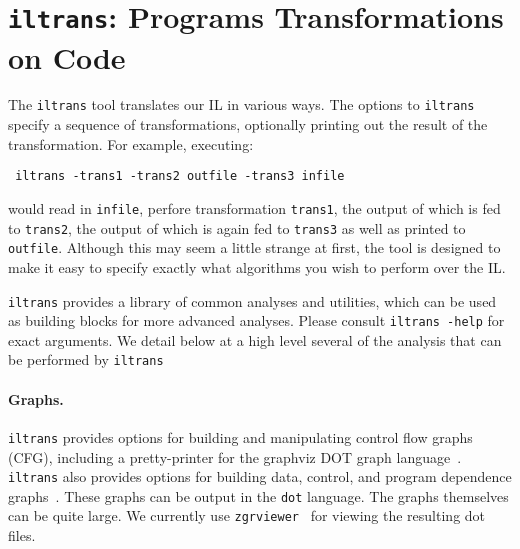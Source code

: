 \section{\texttt{iltrans}: Programs Transformations on \bil Code}
The {\tt iltrans} tool translates our IL in various ways.  The options
to {\tt iltrans} specify a sequence of transformations, optionally
printing out the result of the transformation.   For example,
executing:
\begin{verbatim}
 iltrans -trans1 -trans2 outfile -trans3 infile
\end{verbatim}
would read in {\tt infile}, perfore transformation {\tt trans1}, the
output of which is fed to {\tt trans2}, the output of which is again
fed to {\tt trans3} as well as printed to {\tt outfile}. Although this
may seem a little strange at first, the tool is designed to make it
easy to specify exactly what algorithms you wish to perform over the
IL.


{\tt iltrans} provides a library of common analyses and utilities,
which can be used as building blocks for more advanced analyses.
Please consult {\tt iltrans -help} for exact arguments.  We detail
below at a high level several of the analysis that can be performed by
{\tt iltrans}




\paragraph{Graphs.} {\tt iltrans} provides options for building and
manipulating control flow graphs (CFG), including a pretty-printer for
the graphviz DOT graph language~\cite{graphviz:dot}. {\tt iltrans}
also provides options for building data, control, and program
dependence graphs~\cite{muchnick:1997}.  These graphs can be output in
the {\tt dot} language.  The graphs themselves can be quite large.  We
currently use {\tt zgrviewer}~\cite{zgrviewer} for viewing the
resulting dot files.


